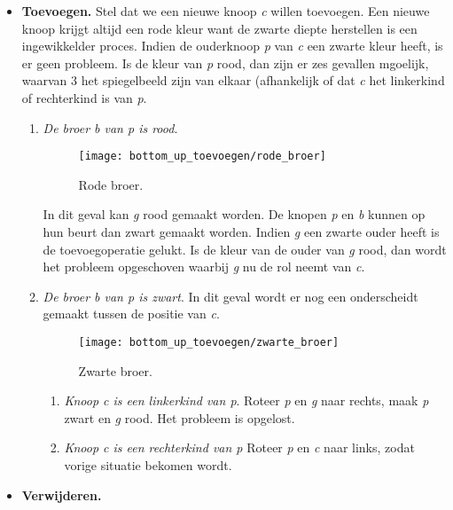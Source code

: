 \documentclass{report}
\begin{document}
	\begin{itemize}
		\item \textbf{Toevoegen.} Stel dat we een nieuwe knoop \textit{c} willen toevoegen. Een nieuwe knoop krijgt altijd een rode kleur want de zwarte diepte herstellen is een ingewikkelder proces. Indien de ouderknoop \textit{p} van \textit{c} een zwarte kleur heeft, is er geen probleem. Is de kleur van \textit{p} rood, dan zijn er zes gevallen mgoelijk, waarvan 3 het spiegelbeeld zijn van elkaar (afhankelijk of dat \textit{c} het linkerkind of rechterkind is van \textit{p}.
		\begin{enumerate}
			\item \textit{De broer b van p is rood}. 
		   	\begin{figure}[h]
				\centering
				\texttt{[image: bottom\_up\_toevoegen/rode\_broer]}
				\caption{Rode broer.}
				\label{fig:rode_broer}
			\end{figure}
			In dit geval kan \textit{g} rood gemaakt worden. De knopen \textit{p} en \textit{b} kunnen op hun beurt dan zwart gemaakt worden. Indien \textit{g} een zwarte ouder heeft is de toevoegoperatie gelukt. Is de kleur van de ouder van \textit{g} rood, dan wordt het probleem opgeschoven waarbij \textit{g} nu de rol neemt van \textit{c}.
			\item \textit{De broer b van p is zwart}. In dit geval wordt er nog een onderscheidt gemaakt tussen de positie van \textit{c}.
			\begin{figure}[h]
				\centering
				\texttt{[image: bottom\_up\_toevoegen/zwarte\_broer]}
				\caption{Zwarte broer.}
				\label{fig:zwarte_broer}
			\end{figure}
			\begin{enumerate}
				
				\item \textit{Knoop c is een linkerkind van p}. Roteer \textit{p} en \textit{g} naar rechts, maak \textit{p} zwart en \textit{g} rood. Het probleem is opgelost.
				\item \textit{Knoop c is een rechterkind van p} Roteer \textit{p} en \textit{c} naar links, zodat vorige situatie bekomen wordt.
				
			\end{enumerate}
		\end{enumerate}
		\item \textbf{Verwijderen.}
		
	\end{itemize}
	
\end{document}
